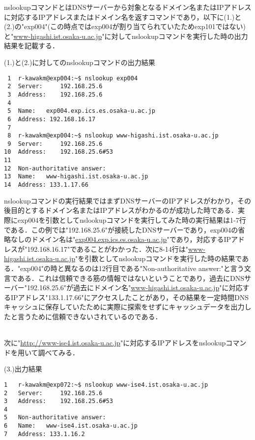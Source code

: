 \documentclass[a4j]{jarticle}
\newenvironment{bit}{\begin{breakitembox}}{\end{breakitembox}} %
\begin{document}

nslookupコマンドとはDNSサーバーから対象となるドメイン名またはIPアドレスに対応するIPアドレスまたはドメイン名を返すコマンドであり，以下に(1.)と(2.)の"exp004"(この時点ではexp004が割り当てられていたためexp101ではない)と"\url{www-higashi.ist.osaka-u.ac.jp}"に対してnslookupコマンドを実行した時の出力結果を記載する．

\begin{bit}[l]{(1.)と(2.)に対してのnslookupコマンドの出力結果}
\small{
\begin{verbatim}
 1	r-kawakm@exp004:~$ nslookup exp004
 2	Server:		192.168.25.6
 3	Address:	192.168.25.6
 4
 5	Name:	exp004.exp.ics.es.osaka-u.ac.jp
 6	Address: 192.168.16.17
 7
 8	r-kawakm@exp004:~$ nslookup www-higashi.ist.osaka-u.ac.jp
 9	Server:		192.168.25.6
10	Address:	192.168.25.6#53
11
12	Non-authoritative answer:
13	Name:	www-higashi.ist.osaka-u.ac.jp
14	Address: 133.1.17.66
\end{verbatim}
}
\end{bit}

nslookupコマンドの実行結果ではまずDNSサーバーのIPアドレスがわかり，その後目的とするドメイン名またはIPアドレスがわかるのが成功した時である．実際にexp004を引数としてnslookupコマンドを実行してみた時の実行結果は1-7行である．この例では"192.168.25.6"が接続したDNSサーバーであり，exp004の省略なしのドメイン名は"\url{exp004.exp.ics.es.osaka-u.ac.jp}"であり，対応するIPアドレスが"192.168.16.17"であることがわかった．次に8-14行は"\url{www-higashi.ist.osaka-u.ac.jp}"を引数としてnslookupコマンドを実行した時の結果である．"exp004"の時と異なるのは12行目である"Non-authoritative answer:"と言う文言である．これは信頼できる筋の情報ではないということであり，過去にDNSサーバー"192.168.25.6"が過去にドメイン名"\url{www-higashi.ist.osaka-u.ac.jp}"に対応するIPアドレス"133.1.17.66"にアクセスしたことがあり，その結果を一定時間DNSキャッシュに保存していたために実際に探索をせずにキャッシュデータを出力したと言うために信頼できないされているのである．

\\

次に"\url{http://www-ise4.ist.osaka-u.ac.jp}"に対応するIPアドレスをnslookupコマンドを用いて調べてみる．

\begin{bit}[l]{(3.)出力結果}
\small{
\begin{verbatim}
1	r-kawakm@exp072:~$ nslookup www-ise4.ist.osaka-u.ac.jp
2	Server:		192.168.25.6
3	Address:	192.168.25.6#53
4
5	Non-authoritative answer:
6	Name:	www-ise4.ist.osaka-u.ac.jp
7	Address: 133.1.16.2
\end{verbatim}
}
\end{bit}
\end{document}
